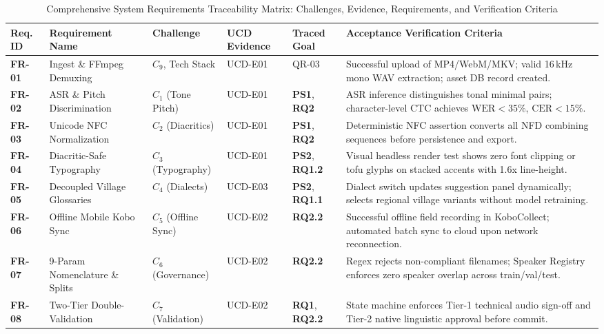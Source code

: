\documentclass[a4paper,11pt]{article}
\begin{document}
\begin{table}[t]
\centering
\scriptsize
\setlength{\tabcolsep}{3.5pt}
\caption{Comprehensive System Requirements Traceability Matrix: Challenges, Evidence, Requirements, and Verification Criteria}
\label{tab:requirements_traceability_report}
\begin{tabular}{p{1.2cm} p{3.2cm} p{1.6cm} p{1.5cm} p{1.8cm} >{\raggedright\arraybackslash}p{7.2cm}}
\toprule
\textbf{Req. ID} & \textbf{Requirement Name} & \textbf{Challenge} & \textbf{UCD Evidence} & \textbf{Traced Goal} & \textbf{Acceptance Verification Criteria} \\
\midrule
\textbf{FR-01} & Ingest \& FFmpeg Demuxing & $C_9$, Tech Stack & UCD-E01 & QR-03 & Successful upload of MP4/WebM/MKV; valid 16\,kHz mono WAV extraction; asset DB record created. \\
\addlinespace
\textbf{FR-02} & ASR \& Pitch Discrimination & $C_1$ (Tone Pitch) & UCD-E01 & \textbf{PS1}, \textbf{RQ2} & ASR inference distinguishes tonal minimal pairs; character-level CTC achieves $\text{WER} < 35\%$, $\text{CER} < 15\%$. \\
\addlinespace
\textbf{FR-03} & Unicode NFC Normalization & $C_2$ (Diacritics) & UCD-E01 & \textbf{PS1}, \textbf{RQ2} & Deterministic NFC assertion converts all NFD combining sequences before persistence and export. \\
\addlinespace
\textbf{FR-04} & Diacritic-Safe Typography & $C_3$ (Typography) & UCD-E01 & \textbf{PS2}, \textbf{RQ1.2} & Visual headless render test shows zero font clipping or tofu glyphs on stacked accents with 1.6x line-height. \\
\addlinespace
\textbf{FR-05} & Decoupled Village Glossaries & $C_4$ (Dialects) & UCD-E03 & \textbf{PS2}, \textbf{RQ1.1} & Dialect switch updates suggestion panel dynamically; selects regional village variants without model retraining. \\
\addlinespace
\textbf{FR-06} & Offline Mobile Kobo Sync & $C_5$ (Offline Sync) & UCD-E02 & \textbf{RQ2.2} & Successful offline field recording in KoboCollect; automated batch sync to cloud upon network reconnection. \\
\addlinespace
\textbf{FR-07} & 9-Param Nomenclature \& Splits & $C_6$ (Governance) & UCD-E02 & \textbf{RQ2.2} & Regex rejects non-compliant filenames; Speaker Registry enforces zero speaker overlap across train/val/test. \\
\addlinespace
\textbf{FR-08} & Two-Tier Double-Validation & $C_7$ (Validation) & UCD-E02 & \textbf{RQ1}, \textbf{RQ2.2} & State machine enforces Tier-1 technical audio sign-off and Tier-2 native linguistic approval before commit. \\

\end{tabular}
\end{table}
\end{document}
